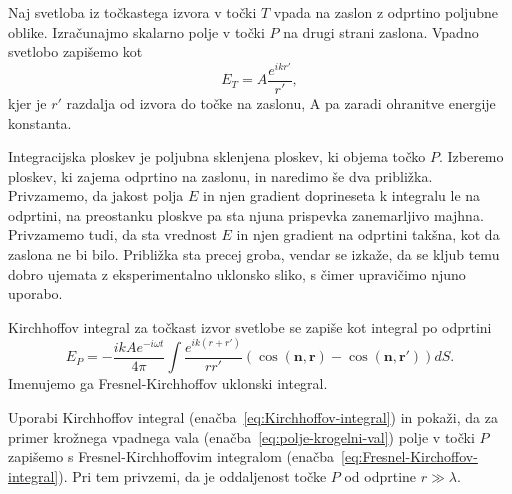 Naj svetloba iz točkastega izvora v točki $T$ vpada na zaslon
z odprtino poljubne oblike. Izračunajmo skalarno polje v točki $P$ na drugi 
strani zaslona. Vpadno svetlobo zapišemo kot
\begin{equation}
\label{eq:polje-krogelni-val}
E_T = A \frac{e^{ikr'}}{r'},
\end{equation}
kjer je $r'$ razdalja od izvora do točke na zaslonu, A pa zaradi ohranitve energije konstanta.

Integracijska ploskev je poljubna sklenjena ploskev, ki objema točko $P$. 
Izberemo ploskev, ki zajema odprtino na zaslonu, in naredimo še dva približka. Privzamemo, da
jakost polja $E$ in njen gradient doprineseta k integralu le na odprtini, na preostanku ploskve
pa sta njuna prispevka zanemarljivo majhna. Privzamemo tudi, da sta vrednost $E$ in njen gradient 
na odprtini takšna, kot da zaslona ne bi bilo.
Približka sta precej groba, vendar se izkaže, da se kljub temu
dobro ujemata z eksperimentalno uklonsko sliko, s čimer 
upravičimo njuno uporabo.

Kirchhoffov integral za točkast izvor svetlobe se zapiše kot integral po odprtini
\begin{equation}
E_P = -\frac{ik A e^{-i\omega t}}{4\pi}\int\frac{e^{ik(r+r')}}{rr'}\left(\cos(\mathbf{n},
\mathbf{r})-\cos(\mathbf{n},\mathbf{r'})\right) dS.
\label{eq:Fresnel-Kirchoffov-integral}
\end{equation}
Imenujemo ga Fresnel-Kirchhoffov uklonski integral.
\begin{naloga}
\label{naloga-Fresnel-Kirchhoff-uklon}
Uporabi Kirchhoffov integral (enačba~\ref{eq:Kirchhoffov-integral}) in pokaži, da 
za primer krožnega vpadnega vala (enačba~\ref{eq:polje-krogelni-val}) polje v točki 
$P$ zapišemo s Fresnel-Kirchhoffovim integralom (enačba~\ref{eq:Fresnel-Kirchoffov-integral}). 
Pri tem privzemi, da je oddaljenost točke $P$ od odprtine $r \gg \lambda$.
\end{naloga}

